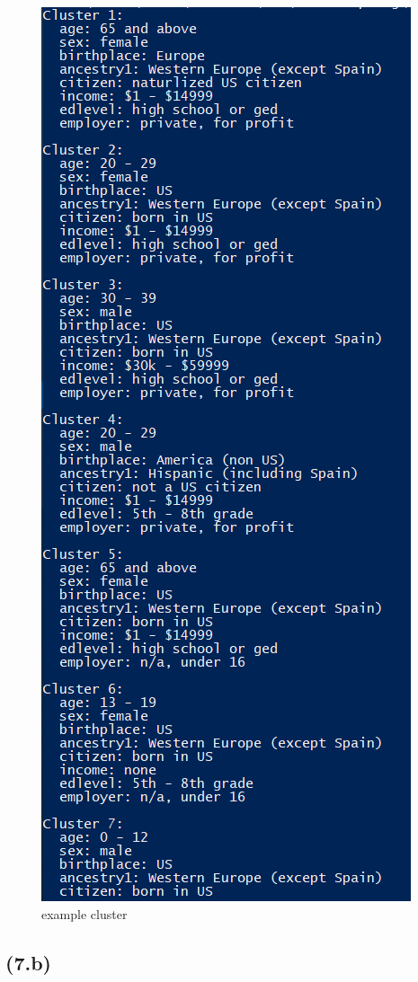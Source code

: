\documentclass[letterpaper, 12pt]{article}
\begin{document}
\begin{figure}[!ht]
    \centering
    \includegraphics[scale=0.7]{clusters}
    \caption{example cluster}
\end{figure}
\pagebreak
\pagebreak

\subsection*{(7.b)}
 
\end{document}
